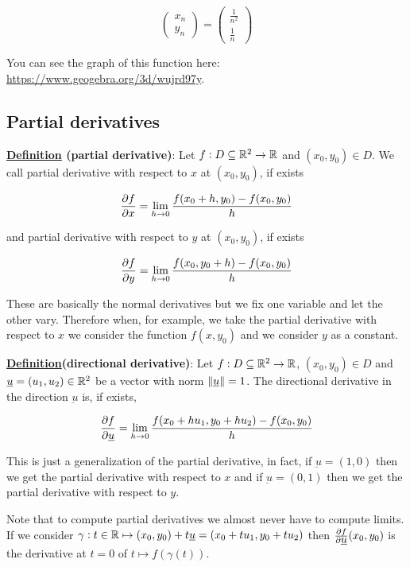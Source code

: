 \documentclass[10pt]{extarticle}
\renewcommand{\vec}[1]{\underbar{\ensuremath{#1}}}
\begin{document}
$$
    \begin{pmatrix}
        x_n \\ y_n
    \end{pmatrix} = \begin{pmatrix}
        \frac{1}{n^2} \\ \frac{1}{n}
    \end{pmatrix}
$$

You can see the graph of this function here:
\url{https://www.geogebra.org/3d/wujrd97y}.

\subsection{Partial derivatives}

\textbf{\underline{Definition} (partial derivative)}: Let $f: D \subseteq \mathbb{R}^2 \to \mathbb{R}$ and $(x_0, y_0) \in D$.
We call partial derivative with respect to $x$ at $(x_0, y_0)$, if exists

$$
    \pdv{f}{x}(x_0, y_0) = \lim_{h \to 0} \frac{f(x_0 + h, y_0) - f(x_0, y_0)}{h}
$$

and partial derivative with respect to $y$ at $(x_0, y_0)$, if exists

$$
    \pdv{f}{y}(x_0, y_0) = \lim_{h \to 0} \frac{f(x_0, y_0 + h) - f(x_0, y_0)}{h}
$$

These are basically the normal derivatives but we fix one variable and let the other vary. Therefore when, for example, we take the partial derivative with respect to $x$ we consider the function $f(x, y_0)$ and we consider $y$ as a constant.

\textbf{\underline{Definition}(directional derivative)}: Let $f: D \subseteq \mathbb{R}^2 \to \mathbb{R}$, $(x_0, y_0) \in D$ and $\vec{u} = (u_1, u_2) \in \R^2$ be a vector with norm $\norm{\vec{u}} = 1$.
The directional derivative in the direction $\vec{u}$ is, if exists,

$$
    \pdv{f}{\vec{u}}(x_0, y_0) = \lim_{h \to 0} \frac{f(x_0 + h u_1, y_0 + h u_2) - f(x_0, y_0)}{h}
$$

This is just a generalization of the partial derivative, in fact, if $\vec{u} = (1, 0)$ then we get the partial derivative with respect to $x$ and if $\vec{u} = (0, 1)$ then we get the partial derivative with respect to $y$.

Note that to compute partial derivatives we almost never have to compute limits. If we consider $\gamma: t \in \R \mapsto (x_0, y_0) + t\vec{u} = (x_0 + t u_1, y_0 + t u_2)$ then $\pdv{f}{\vec{u}}() (x_0, y_0)$ is the derivative at $t = 0$ of $t \mapsto f(\gamma(t))$.
\end{document}
